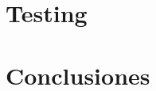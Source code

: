 \documentclass[a4paper, 10pt, twoside]{article}
\begin{document}
\section{Testing}
%

\newpage



\section{Conclusiones}
%
\end{document}
